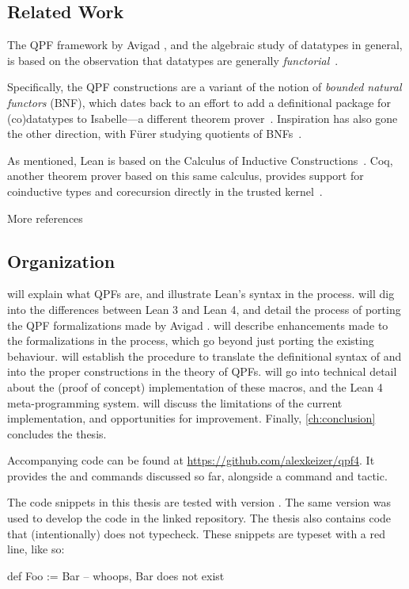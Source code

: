 \subsection*{Related Work}
The QPF framework by Avigad \etal{}, and the algebraic study of datatypes in general, is based on the observation that datatypes are generally \emph{functorial}~\cite{avigadDataTypesQuotients2019a}.

Specifically, the QPF constructions are a variant of the notion of \emph{bounded natural functors} (BNF), 
which dates back to an effort to add a definitional package for (co)datatypes to Isabelle---a different theorem prover~\cite{biendarraDefiningCoDatatypes,traytelCategoryTheoryBased}.
Inspiration has also gone the other direction, with Fürer \etal{} studying quotients of BNFs~\cite{furerQuotientsBoundedNatural2022}.



As mentioned, Lean is based on the Calculus of Inductive Constructions~\cite{coquandMetamathematicalInvestigationsCalculus1989}.
Coq, another theorem prover based on this same calculus, provides support
for coinductive types and corecursion directly in the trusted kernel~\cite{gimenezApplicationCoinductiveTypes1996,gimenezTutorialRecursiveTypes1998}.


\begin{todo}
    More references
\end{todo}


\subsection*{Organization}
 will explain what QPFs are, and illustrate Lean's syntax in the process.
 will dig into the differences between Lean 3 and Lean 4, and detail the process of porting the QPF formalizations made by Avigad \etal{}.
 will describe enhancements made to the formalizations in the process, which go beyond just porting the existing behaviour.
 will establish the procedure to translate the definitional syntax of \data{} and \codata{} into the proper constructions in the theory of QPFs.
 will go into technical detail about the (proof of concept)
implementation of these macros, and the Lean 4 meta-programming system.
 will discuss the limitations of the current implementation, and opportunities for improvement.
Finally, \cref{ch:conclusion} concludes the thesis.

Accompanying code can be found at \url{https://github.com/alexkeizer/qpf4}.
It provides the \data{} and \codata{} commands discussed so far, alongside a  command and  tactic.

The code snippets in this thesis are tested with version . The same version was used to develop the code in the linked repository.
The thesis also contains code that (intentionally) does not typecheck. These snippets are typeset with a red line, like so:
\begin{badleancode}

    def Foo := Bar -- whoops, Bar does not exist

\end{badleancode}